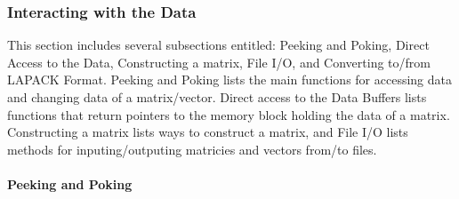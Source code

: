 \subsubsection{Interacting with the Data}
\label{ml_iwtd}
This section includes several subsections entitled: Peeking and 
Poking, Direct Access to the Data, Constructing a matrix, File I/O, 
and Converting to/from LAPACK Format.  Peeking and Poking lists the 
main functions for accessing data and changing data of a 
matrix/vector.  Direct access to the Data Buffers lists functions that return 
pointers to the memory block holding the data of a matrix.  
Constructing a matrix lists ways to construct a matrix, and File I/O 
lists methods for inputing/outputing matricies and vectors from/to 
files.

\paragraph{Peeking and Poking}
